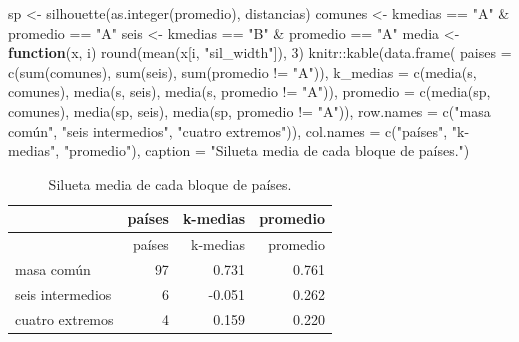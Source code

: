 \documentclass[oneside, openany, fontset=libertinus]{mitthesis}
\newenvironment{Shaded}{\begin{snugshade}}{\end{snugshade}}
\newcommand{\AttributeTok}[1]{\textcolor[rgb]{0.40,0.45,0.13}{#1}}
\newcommand{\ControlFlowTok}[1]{\textcolor[rgb]{0.00,0.23,0.31}{\textbf{#1}}}
\newcommand{\DecValTok}[1]{\textcolor[rgb]{0.68,0.00,0.00}{#1}}
\newcommand{\FunctionTok}[1]{\textcolor[rgb]{0.28,0.35,0.67}{#1}}
\newcommand{\NormalTok}[1]{\textcolor[rgb]{0.00,0.23,0.31}{#1}}
\newcommand{\OtherTok}[1]{\textcolor[rgb]{0.00,0.23,0.31}{#1}}
\newcommand{\SpecialCharTok}[1]{\textcolor[rgb]{0.37,0.37,0.37}{#1}}
\newcommand{\StringTok}[1]{\textcolor[rgb]{0.13,0.47,0.30}{#1}}
\begin{document}
\begin{Shaded}
\begin{Highlighting}[]
\NormalTok{sp }\OtherTok{\textless{}{-}} \FunctionTok{silhouette}\NormalTok{(}\FunctionTok{as.integer}\NormalTok{(promedio), distancias)}
\NormalTok{comunes }\OtherTok{\textless{}{-}}\NormalTok{ kmedias }\SpecialCharTok{==} \StringTok{"A"} \SpecialCharTok{\&}\NormalTok{ promedio }\SpecialCharTok{==} \StringTok{"A"}
\NormalTok{seis }\OtherTok{\textless{}{-}}\NormalTok{ kmedias }\SpecialCharTok{==} \StringTok{"B"} \SpecialCharTok{\&}\NormalTok{ promedio }\SpecialCharTok{==} \StringTok{"A"}
\NormalTok{media }\OtherTok{\textless{}{-}} \ControlFlowTok{function}\NormalTok{(x, i) }\FunctionTok{round}\NormalTok{(}\FunctionTok{mean}\NormalTok{(x[i, }\StringTok{"sil\_width"}\NormalTok{]), }\DecValTok{3}\NormalTok{)}
\NormalTok{knitr}\SpecialCharTok{::}\FunctionTok{kable}\NormalTok{(}\FunctionTok{data.frame}\NormalTok{(}
  \AttributeTok{paises =} \FunctionTok{c}\NormalTok{(}\FunctionTok{sum}\NormalTok{(comunes), }\FunctionTok{sum}\NormalTok{(seis), }\FunctionTok{sum}\NormalTok{(promedio }\SpecialCharTok{!=} \StringTok{"A"}\NormalTok{)),}
  \AttributeTok{k\_medias =} \FunctionTok{c}\NormalTok{(}\FunctionTok{media}\NormalTok{(s, comunes), }\FunctionTok{media}\NormalTok{(s, seis),}
               \FunctionTok{media}\NormalTok{(s, promedio }\SpecialCharTok{!=} \StringTok{"A"}\NormalTok{)),}
  \AttributeTok{promedio =} \FunctionTok{c}\NormalTok{(}\FunctionTok{media}\NormalTok{(sp, comunes), }\FunctionTok{media}\NormalTok{(sp, seis),}
               \FunctionTok{media}\NormalTok{(sp, promedio }\SpecialCharTok{!=} \StringTok{"A"}\NormalTok{)),}
  \AttributeTok{row.names =} \FunctionTok{c}\NormalTok{(}\StringTok{"masa común"}\NormalTok{, }\StringTok{"seis intermedios"}\NormalTok{,}
                \StringTok{"cuatro extremos"}\NormalTok{)),}
  \AttributeTok{col.names =} \FunctionTok{c}\NormalTok{(}\StringTok{"países"}\NormalTok{, }\StringTok{"k{-}medias"}\NormalTok{, }\StringTok{"promedio"}\NormalTok{),}
  \AttributeTok{caption =} \StringTok{"Silueta media de cada bloque de países."}\NormalTok{)}
\end{Highlighting}
\end{Shaded}

\Needspace{1.74in}

\begin{longtable}[]{@{}lrrr@{}}
\caption{Silueta media de cada bloque de países.}\tabularnewline
\toprule\noalign{}
& países & k-medias & promedio \\
\midrule\noalign{}
\endfirsthead
\toprule\noalign{}
& países & k-medias & promedio \\
\midrule\noalign{}
\endhead
\bottomrule\noalign{}
\endlastfoot
masa común & 97 & 0.731 & 0.761 \\
seis intermedios & 6 & -0.051 & 0.262 \\
cuatro extremos & 4 & 0.159 & 0.220 \\
\end{longtable}
\end{document}
